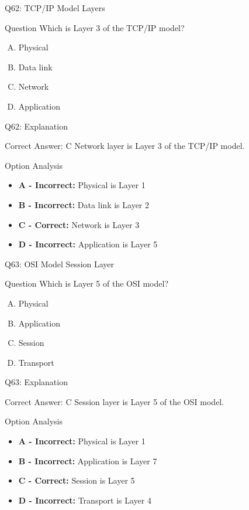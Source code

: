\documentclass{beamer}
\begin{document}
	\begin{frame}{Q62: TCP/IP Model Layers}
		\begin{block}{Question}
			Which is Layer 3 of the TCP/IP model?
		\end{block}
		\begin{enumerate}[(A)]
			\item Physical
			\item Data link
			\item Network
			\item Application
		\end{enumerate}
	\end{frame}
	
	\begin{frame}{Q62: Explanation}
		\begin{block}{Correct Answer: C}
			Network layer is Layer 3 of the TCP/IP model.
		\end{block}
		\begin{block}{Option Analysis}
			\begin{itemize}
				\item \textbf{A - Incorrect:} Physical is Layer 1
				\item \textbf{B - Incorrect:} Data link is Layer 2
				\item \textbf{C - Correct:} Network is Layer 3
				\item \textbf{D - Incorrect:} Application is Layer 5
			\end{itemize}
		\end{block}
	\end{frame}
	
	\begin{frame}{Q63: OSI Model Session Layer}
		\begin{block}{Question}
			Which is Layer 5 of the OSI model?
		\end{block}
		\begin{enumerate}[(A)]
			\item Physical
			\item Application
			\item Session
			\item Transport
		\end{enumerate}
	\end{frame}
	
	\begin{frame}{Q63: Explanation}
		\begin{block}{Correct Answer: C}
			Session layer is Layer 5 of the OSI model.
		\end{block}
		\begin{block}{Option Analysis}
			\begin{itemize}
				\item \textbf{A - Incorrect:} Physical is Layer 1
				\item \textbf{B - Incorrect:} Application is Layer 7
				\item \textbf{C - Correct:} Session is Layer 5
				\item \textbf{D - Incorrect:} Transport is Layer 4
			\end{itemize}
		\end{block}
	\end{frame}
	
\end{document}
